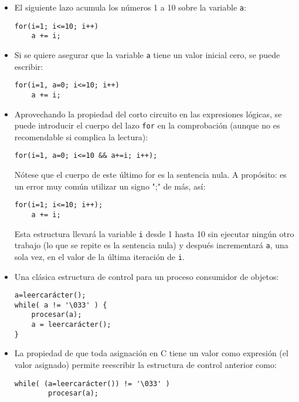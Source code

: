 \begin{ejemplo}\noindent
\begin{itemize}
	\item El siguiente lazo acumula los números 1 a 10 sobre la variable \lstinline{a}:
\begin{lstlisting}
for(i=1; i<=10; i++)
    a += i;
\end{lstlisting}

\item Si se quiere asegurar que la variable \lstinline{a} tiene un valor inicial cero, se puede
escribir:
\begin{lstlisting}
for(i=1, a=0; i<=10; i++)
	a += i;
\end{lstlisting}

\item Aprovechando la propiedad del corto circuito en las expresiones lógicas, se
puede introducir el cuerpo del lazo \lstinline{for} en la comprobación (aunque no es
recomendable si complica la lectura):

\begin{lstlisting}
for(i=1, a=0; i<=10 && a+=i; i++);
\end{lstlisting}

Nótese que el cuerpo de este último for es la sentencia nula. A propósito: es
un error muy común utilizar un signo ";" de más, así:
\begin{lstlisting}
for(i=1; i<=10; i++);
    a += i;
\end{lstlisting}

Esta estructura llevará la variable \lstinline{i} desde 1 hasta 10 sin ejecutar ningún otro
trabajo (lo que se repite es la sentencia nula) y después incrementará \lstinline{a}, una
sola vez, en el valor de la última iteración de \lstinline{i}.

\item Una clásica estructura de control para un proceso consumidor de objetos:
\begin{lstlisting}
a=leercarácter();
while( a != '\033' ) {
    procesar(a);
    a = leercarácter();
}
\end{lstlisting}

\item La propiedad de que toda asignación en C tiene un valor como expresión (el valor
asignado) permite reescribir la estructura de control anterior como:

\begin{lstlisting}
while( (a=leercarácter()) != '\033' )
        procesar(a);
\end{lstlisting}


\end{itemize}
\end{ejemplo}
